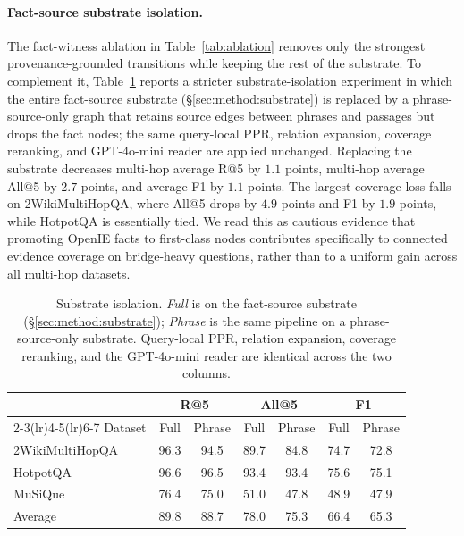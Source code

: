 \paragraph{Fact-source substrate isolation.}
The fact-witness ablation in Table~\ref{tab:ablation} removes only
the strongest provenance-grounded transitions while keeping the rest
of the substrate. To complement it, Table~\ref{tab:substrate-iso}
reports a stricter substrate-isolation experiment in which the entire
fact-source substrate (\S\ref{sec:method:substrate}) is replaced by a
phrase-source-only graph that retains source edges between phrases
and passages but drops the fact nodes; the same query-local PPR,
relation expansion, coverage reranking, and GPT-4o-mini reader are
applied unchanged. Replacing the substrate decreases multi-hop
average R@5 by $1.1$ points, multi-hop average All@5 by $2.7$
points, and average F1 by $1.1$ points. The largest coverage loss
falls on 2WikiMultiHopQA, where All@5 drops by $4.9$ points and F1
by $1.9$ points, while HotpotQA is essentially tied. We read this
as cautious evidence that promoting OpenIE facts to first-class
nodes contributes specifically to connected evidence coverage on
bridge-heavy questions, rather than to a uniform gain across all
multi-hop datasets.

\begin{table}[t]
\centering
\small
\setlength{\tabcolsep}{3pt}
\begin{tabular}{lccc ccc}
\toprule
& \multicolumn{2}{c}{R@5} & \multicolumn{2}{c}{All@5} & \multicolumn{2}{c}{F1} \\
\cmidrule(lr){2-3}\cmidrule(lr){4-5}\cmidrule(lr){6-7}
Dataset & Full & Phrase & Full & Phrase & Full & Phrase \\
\midrule
2WikiMultiHopQA & 96.3 & 94.5 & 89.7 & 84.8 & 74.7 & 72.8 \\
HotpotQA        & 96.6 & 96.5 & 93.4 & 93.4 & 75.6 & 75.1 \\
MuSiQue         & 76.4 & 75.0 & 51.0 & 47.8 & 48.9 & 47.9 \\
\midrule
Average         & 89.8 & 88.7 & 78.0 & 75.3 & 66.4 & 65.3 \\
\bottomrule
\end{tabular}
\caption{Substrate isolation. \emph{Full} is \methodname{} on the
fact-source substrate (\S\ref{sec:method:substrate}); \emph{Phrase} is
the same pipeline on a phrase-source-only substrate. Query-local PPR,
relation expansion, coverage reranking, and the GPT-4o-mini reader
are identical across the two columns.}
\label{tab:substrate-iso}
\end{table}

